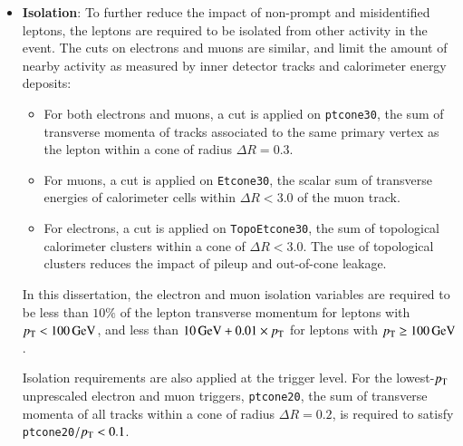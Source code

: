 \begin{itemize}
	\item \textbf{Isolation}: To further reduce the impact of non-prompt and misidentified leptons, the leptons are required to be isolated from other activity in the event. The cuts on electrons and muons are similar, and limit the amount of nearby activity as measured by inner detector tracks and calorimeter energy deposits:

	\begin{itemize}
		\item For both electrons and muons, a cut is applied on \verb.ptcone30., the sum of transverse momenta of tracks associated to the same primary vertex as the lepton within a cone of radius $\Delta R=0.3$. 
		\item For muons, a cut is applied on \verb.Etcone30., the scalar sum of transverse energies of calorimeter cells within $\Delta R<3.0$ of the muon track. 
		\item For electrons, a cut is applied on \verb.TopoEtcone30., the sum of topological calorimeter clusters within a cone of $\Delta R < 3.0$. The use of topological clusters reduces the impact of pileup and out-of-cone leakage.
	\end{itemize}

	In this dissertation, the electron and muon isolation variables are required to be less than $10\%$ of the lepton transverse momentum for leptons with $p_{\text{T}}<\SI{100}{\giga\electronvolt}$, and less than $\SI{10}{\giga\electronvolt}+0.01\times p_{\text{T}}$ for leptons with $p_{\text{T}}\geq \SI{100}{\giga\electronvolt}$. 

	Isolation requirements are also applied at the trigger level. For the lowest-$p_{\text{T}}$ unprescaled electron and muon triggers, \verb.ptcone20., the sum of transverse momenta of all tracks within a cone of radius $\Delta R=0.2$, is required to satisfy \verb.ptcone20.$/p_{\text{T}}<0.1$. 
\end{itemize}

